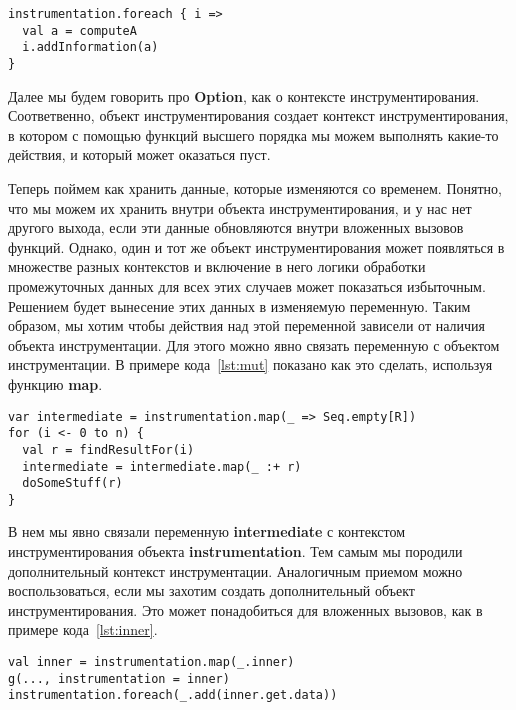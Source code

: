 \begin{samepage}
\begin{lstlisting}[caption={Действия внутри контекста инструментирования},label=lst:ctx]
instrumentation.foreach { i =>
  val a = computeA
  i.addInformation(a)
}
\end{lstlisting}
\end{samepage}

Далее мы будем говорить про \textbf{Option}, как о контексте инструментирования.
Соответвенно, объект инструментирования создает контекст инструментирования,
в котором с помощью функций высшего порядка мы можем выполнять какие-то действия,
и который может оказаться пуст.

Теперь поймем как хранить данные, которые изменяются со временем.
Понятно, что мы можем их хранить внутри объекта инструментирования, и у нас нет другого
выхода, если эти данные обновляются внутри вложенных вызовов функций.
Однако, один и тот же объект инструментирования может появляться в множестве разных
контекстов и включение в него логики обработки промежуточных данных для
всех этих случаев может показаться избыточным.
Решением будет вынесение этих данных в изменяемую переменную.
Таким образом, мы хотим чтобы действия над этой переменной зависели от наличия объекта
инструментации.
Для этого можно явно связать переменную с объектом инструментации.
В примере кода~\ref{lst:mut} показано как это сделать, используя функцию \textbf{map}.

\begin{samepage}
\begin{lstlisting}[caption={Привязка к контексту инструментирования},label=lst:mut]
var intermediate = instrumentation.map(_ => Seq.empty[R])
for (i <- 0 to n) {
  val r = findResultFor(i)
  intermediate = intermediate.map(_ :+ r)
  doSomeStuff(r)
}
\end{lstlisting}
\end{samepage}

В нем мы явно связали переменную \textbf{intermediate} с контекстом
инструментирования объекта \textbf{instrumentation}.
Тем самым мы породили дополнительный контекст инструментации.
Аналогичным приемом можно воспользоваться, если мы захотим создать дополнительный
объект инструментирования.
Это может понадобиться для вложенных вызовов, как в примере
кода~\ref{lst:inner}.

\begin{lstlisting}[caption={Создание нового объекта инструментирования},label=lst:inner]
val inner = instrumentation.map(_.inner)
g(..., instrumentation = inner)
instrumentation.foreach(_.add(inner.get.data))
\end{lstlisting}

